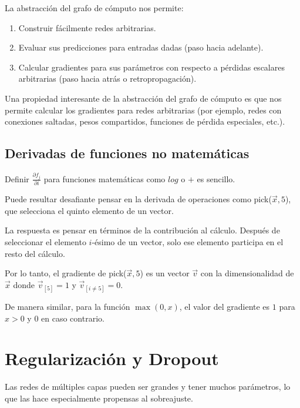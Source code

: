 La abstracción del grafo de cómputo nos permite:

\begin{enumerate}
  \item Construir fácilmente redes arbitrarias.
  \item Evaluar sus predicciones para entradas dadas (paso hacia adelante).
  \item Calcular gradientes para sus parámetros con respecto a pérdidas escalares arbitrarias (paso hacia atrás o retropropagación).
\end{enumerate}

Una propiedad interesante de la abstracción del grafo de cómputo es que nos permite calcular los gradientes para redes arbitrarias (por ejemplo, redes con conexiones saltadas, pesos compartidos, funciones de pérdida especiales, etc.).


\subsection{Derivadas de funciones no matemáticas}
Definir $\frac{\partial f_j}{\partial i}$ para funciones matemáticas como $log$ o $+$ es sencillo.

Puede resultar desafiante pensar en la derivada de operaciones como pick($\vec{x},5$), que selecciona el quinto elemento de un vector.

La respuesta es pensar en términos de la contribución al cálculo. Después de seleccionar el elemento $i$-ésimo de un vector, solo ese elemento participa en el resto del cálculo.

Por lo tanto, el gradiente de pick($\vec{x},5$) es un vector $\vec{v}$ con la dimensionalidad de $\vec{x}$ donde $\vec{v}_{[5]} = 1$ y $\vec{v}_{[i \neq 5]} = 0$.

De manera similar, para la función $\max(0,x)$, el valor del gradiente es $1$ para $x > 0$ y $0$ en caso contrario.

\section{Regularización y Dropout}
Las redes de múltiples capas pueden ser grandes y tener muchos parámetros, lo que las hace especialmente propensas al sobreajuste.

